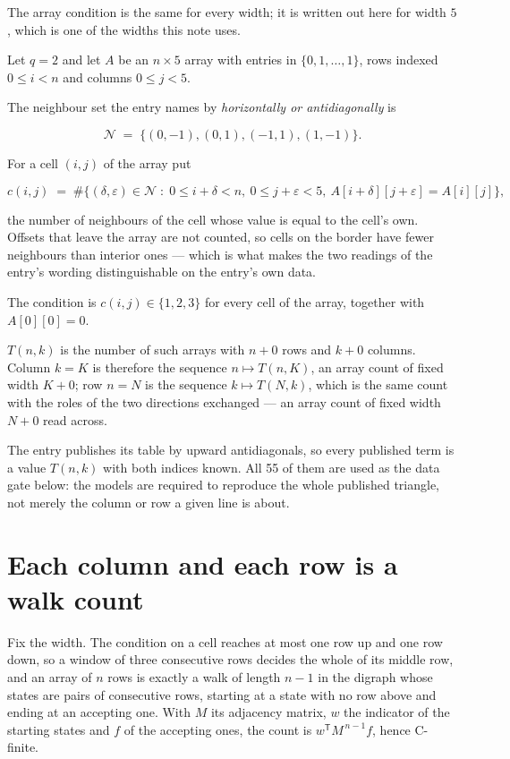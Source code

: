 \documentclass[11pt]{article}
\theoremstyle{definition}
\begin{document}
The array condition is the same for every width; it is written out here for width $5$, which is one of the widths this note uses.

Let $q = 2$ and let $A$ be an $n \times 5$ array with entries in $\{0,1,\dots,1\}$, rows indexed $0 \le i < n$ and columns $0 \le j < 5$.

The neighbour set the entry names by {\itshape horizontally or antidiagonally} is

\[\mathcal{N} \;=\; \{(0,-1), (0,1), (-1,1), (1,-1)\}.\]

For a cell $(i,j)$ of the array put

\[c(i,j) \;=\; \#\bigl\{(\delta,\varepsilon)\in\mathcal{N} \;:\; 0\le i+\delta<n,\ 0\le j+\varepsilon<5,\ A[i+\delta][j+\varepsilon] = A[i][j]\bigr\},\]

the number of neighbours of the cell whose value is equal to the cell's own. Offsets that leave the array are not counted, so cells on the border have fewer neighbours than interior ones --- which is what makes the two readings of the entry's wording distinguishable on the entry's own data.

The condition is $c(i,j) \in \{1, 2, 3\}$ for every cell of the array, together with $A[0][0]=0$.

$T(n,k)$ is the number of such arrays with $n + 0$ rows and $k + 0$ columns. Column $k = K$ is therefore the sequence $n \mapsto T(n,K)$, an array count of fixed width $K + 0$; row $n = N$ is the sequence $k \mapsto T(N,k)$, which is the same count with the roles of the two directions exchanged --- an array count of fixed width $N + 0$ read across.

The entry publishes its table by upward antidiagonals, so every published term is a value $T(n,k)$ with both indices known. All 55 of them are used as the data gate below: the models are required to reproduce the whole published triangle, not merely the column or row a given line is about.

\section{Each column and each row is a walk count}

Fix the width. The condition on a cell reaches at most one row up and one row down, so a window of three consecutive rows decides the whole of its middle row, and an array of $n$ rows is exactly a walk of length $n-1$ in the digraph whose states are pairs of consecutive rows, starting at a state with no row above and ending at an accepting one. With $M$ its adjacency matrix, $w$ the indicator of the starting states and $f$ of the accepting ones, the count is $w^{\mathsf T}M^{\,n-1}f$, hence C-finite.
\end{document}
